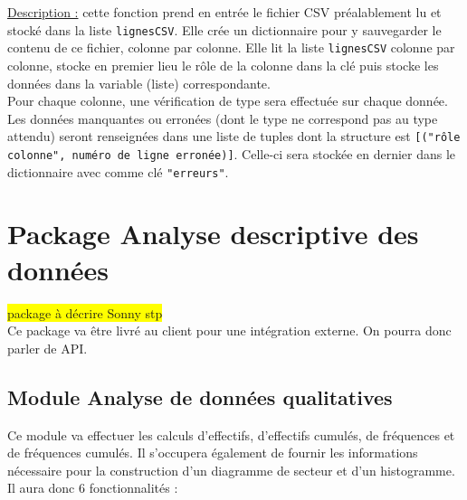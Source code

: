 \begin{enumerate}
					\underline{Description :} cette fonction prend en entrée le fichier CSV préalablement lu et stocké dans la liste \lstinline!lignesCSV!. Elle crée un dictionnaire pour y sauvegarder le contenu de ce fichier, colonne par colonne. Elle lit la liste \lstinline!lignesCSV! colonne par colonne, stocke en premier lieu le rôle de la colonne dans la clé puis stocke les données dans la variable (liste) correspondante. \\
					Pour chaque colonne, une vérification de type sera effectuée sur chaque donnée. Les données manquantes ou erronées (dont le type ne correspond pas au type attendu) seront renseignées dans une liste de tuples dont la structure est \lstinline![("rôle colonne", numéro de ligne erronée)]!. Celle-ci sera stockée en dernier dans le dictionnaire avec comme clé \lstinline!"erreurs"!.
			\end{enumerate}
	
	\section{Package Analyse descriptive des données}
	\colorbox{yellow}{package à décrire Sonny stp}\\
	Ce package va être livré au client pour une intégration externe. On pourra donc parler de API.
	
		\subsection{Module Analyse de données qualitatives}
			Ce module va effectuer les calculs d'effectifs, d'effectifs cumulés, de fréquences et de fréquences cumulés. Il s'occupera également de fournir les informations nécessaire pour la construction d'un diagramme de secteur et d'un histogramme. Il aura donc 6 fonctionnalités :
	
